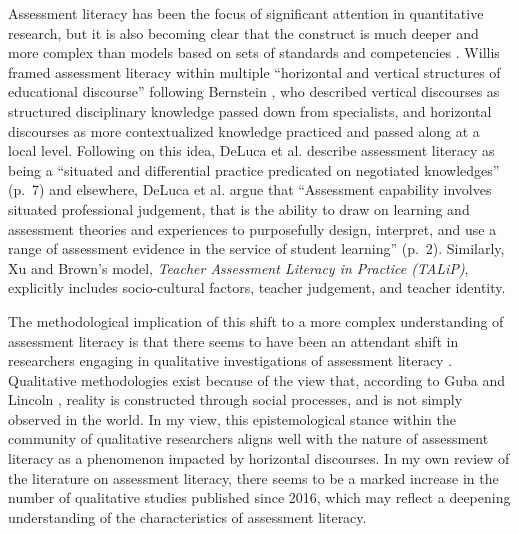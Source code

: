\documentclass[
]{book}
\begin{document}
Assessment literacy has been the focus of significant attention in quantitative research, but it is also becoming clear that the construct is much deeper and more complex than models based on sets of standards and competencies \citep{delucaPoliciesProgramsPractices2019, delucaPoliciesProgramsPractices2019, willisConceptualisingTeachersAssessment2013, xuTeacherAssessmentLiteracy2016}. Willis \citeyearpar{willisConceptualisingTeachersAssessment2013} framed assessment literacy within multiple ``horizontal and vertical structures of educational discourse'' following Bernstein \citeyearpar{bernsteinVerticalHorizontalDiscourse1999}, who described vertical discourses as structured disciplinary knowledge passed down from specialists, and horizontal discourses as more contextualized knowledge practiced and passed along at a local level. Following on this idea, DeLuca et al. \citeyearpar{delucaDifferentialSituatedView2019} describe assessment literacy as being a ``situated and differential practice predicated on negotiated knowledges'' (p.~7) and elsewhere, DeLuca et al. \citeyearpar{delucaPoliciesProgramsPractices2019} argue that ``Assessment capability involves situated professional judgement, that is the ability to draw on learning and assessment theories and experiences to purposefully design, interpret, and use a range of assessment evidence in the service of student learning'' (p.~2). Similarly, Xu and Brown's \citeyearpar{xuTeacherAssessmentLiteracy2016} model, \emph{Teacher Assessment Literacy in Practice (TALiP)}, explicitly includes socio-cultural factors, teacher judgement, and teacher identity.

The methodological implication of this shift to a more complex understanding of assessment literacy is that there seems to have been an attendant shift in researchers engaging in qualitative investigations of assessment literacy \citep{bearmanHowUniversityTeachers2017, delucaPedagogySlowSignificant2021, fivesNavigatingComplexCognitive2020, medlandAssessmentIlliterateShared2019, watsonSmallDataOnline2017}. Qualitative methodologies exist because of the view that, according to Guba and Lincoln \citeyearpar{gubaFourthGenerationEvaluation1989}, reality is constructed through social processes, and is not simply observed in the world. In my view, this epistemological stance within the community of qualitative researchers aligns well with the nature of assessment literacy as a phenomenon impacted by horizontal discourses. In my own review of the literature on assessment literacy, there seems to be a marked increase in the number of qualitative studies published since 2016, which may reflect a deepening understanding of the characteristics of assessment literacy.
\end{document}
